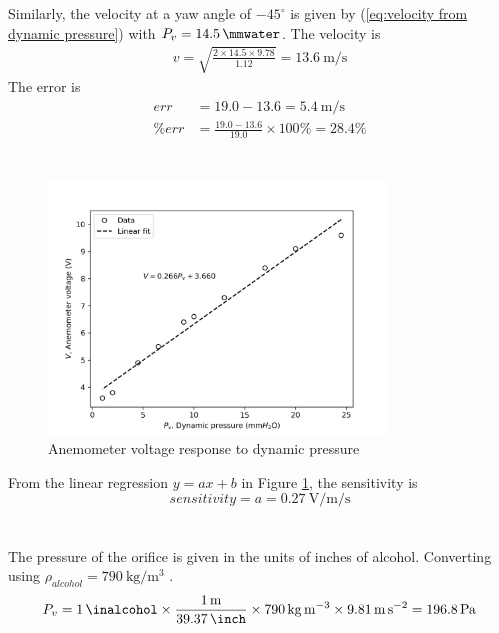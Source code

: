 \section{}
Similarly, the velocity at a yaw angle of $-45^\circ$ is given by (\ref{eq:velocity from dynamic pressure}) with 
$P_v = \qty{14.5}{\mmwater}$. The velocity is
\begin{align*}
    v = \sqrt{\frac{2 \times 14.5 \times 9.78}{1.12}} = \boxed{\qty{13.6}{\meter\per\second}}
\end{align*}
The error is
\begin{align*}
    err &= 19.0 - 13.6 = \boxed{\qty{5.4}{\meter\per\second}} \\
    \% err &= \frac{19.0 - 13.6}{19.0} \times 100\% = \boxed{28.4\%}
\end{align*}

\section{}
\begin{figure}[h]
    \centering
    \includegraphics[width=0.8\textwidth]{matplotlib/anemometer_calibration.png}
    \caption{Anemometer voltage response to dynamic pressure}
    \label{fig:anemometer_calibration}
\end{figure}

From the linear regression $y = ax + b$ in Figure \ref{fig:anemometer_calibration}, the sensitivity is
\begin{equation*}
    sensitivity = a = \boxed{\qty{0.27}{\volt\per\meter\per\second}}
\end{equation*}

\section{}
The pressure of the orifice is given in the units of inches of alcohol. Converting using $\rho_{alcohol} = \qty{790}{\kilogram\per\meter\cubed}$ 
\cite{ferner_alcohol_2001}.
\begin{align*}
    P_v = \qty{1}{\inalcohol} \times \frac{\qty{1}{\meter}}{\qty{39.37}{\inch}} \times 
    \qty{790}{\kilogram\per\meter\cubed} \times \qty{9.81}{\meter\per\second\squared} = \qty{196.8}{\pascal}
\end{align*}

